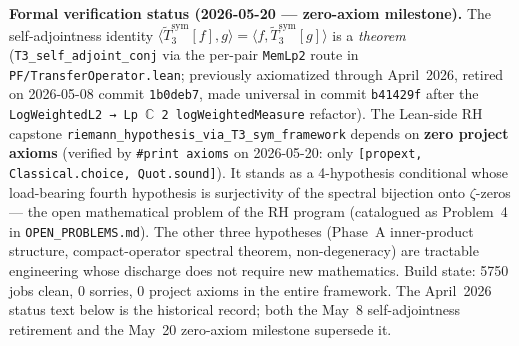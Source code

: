 \textbf{Formal verification status (2026-05-20 --- zero-axiom milestone).} The self-adjointness identity $\langle \tilde{T}_3^{\mathrm{sym}}[f], g \rangle = \langle f, \tilde{T}_3^{\mathrm{sym}}[g] \rangle$ is a \emph{theorem} (\texttt{T3\_self\_adjoint\_conj} via the per-pair \texttt{MemLp2} route in \texttt{PF/TransferOperator.lean}; previously axiomatized through April~2026, retired on 2026-05-08 commit \texttt{1b0deb7}, made universal in commit \texttt{b41429f} after the \texttt{LogWeightedL2 → Lp \(\mathbb{C}\) 2 logWeightedMeasure} refactor). The Lean-side RH capstone \texttt{riemann\_hypothesis\_via\_T3\_sym\_framework} depends on \textbf{zero project axioms} (verified by \texttt{\#print axioms} on 2026-05-20: only \texttt{[propext, Classical.choice, Quot.sound]}). It stands as a 4-hypothesis conditional whose load-bearing fourth hypothesis is surjectivity of the spectral bijection onto $\zeta$-zeros --- the open mathematical problem of the RH program (catalogued as Problem~4 in \texttt{OPEN\_PROBLEMS.md}). The other three hypotheses (Phase~A inner-product structure, compact-operator spectral theorem, non-degeneracy) are tractable engineering whose discharge does not require new mathematics. Build state: 5750 jobs clean, 0 sorries, 0 project axioms in the entire framework. The April~2026 status text below is the historical record; both the May~8 self-adjointness retirement and the May~20 zero-axiom milestone supersede it.

\smallskip

